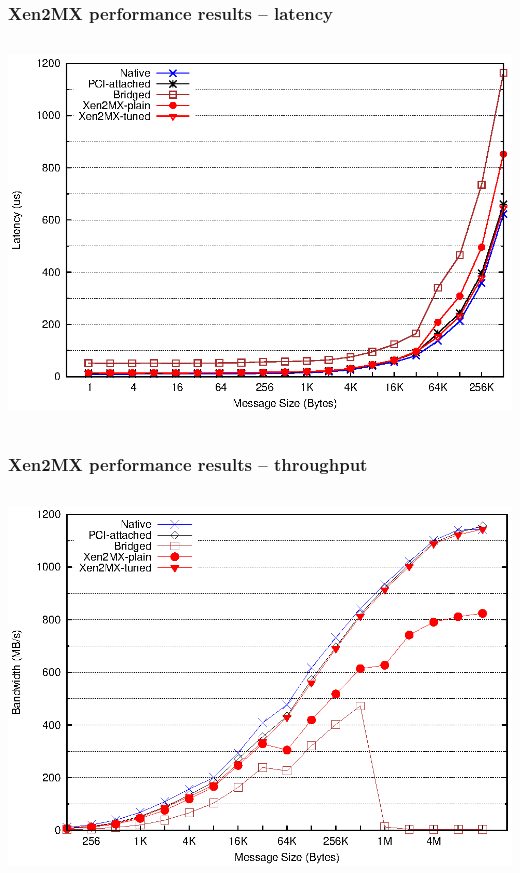 \documentclass[red,slidestop,notes,compress,mathserif]{beamer}
\begin{document}
\begin{frame}
\frametitle{Xen2MX performance results -- latency}
\begin{columns}
\includegraphics[width=\textwidth]{figs/bare/lat_pingpong.eps}
\end{columns}
\end{frame}

\begin{frame}
\frametitle{Xen2MX performance results -- throughput}
\begin{columns}
\includegraphics[width=\textwidth]{figs/bare/bw_pingpong.eps}
\end{columns}
\end{frame}
\end{document}
